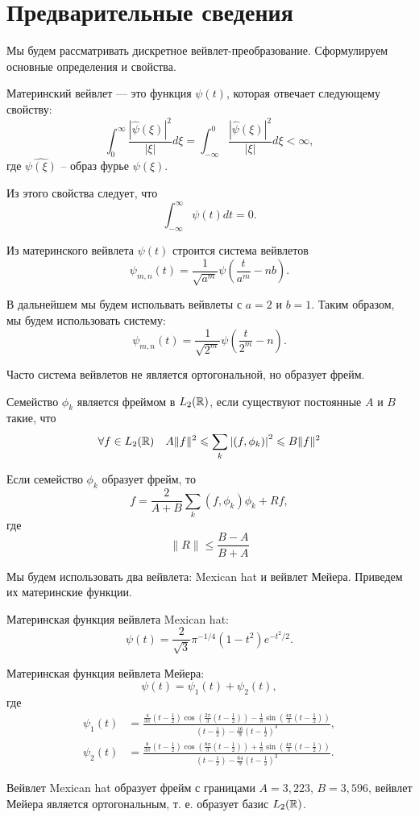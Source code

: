 \documentclass[../paper.tex]{subfiles}
\begin{document}
\section{Предварительные сведения}
Мы будем рассматривать дискретное вейвлет-преобразование. Сформулируем основные определения и свойства.
\begin{Def}
Материнский вейвлет --- это функция $\psi(t)$, которая отвечает следующему свойству:
\[
	\int_0^\infty \frac{ \left|\hat{\psi}(\xi)\right|^2 }{\left|\xi\right|} d \xi
	= \int_{-\infty}^0 \frac{ \left|\hat{\psi}(\xi)\right|^2 }{\left|\xi\right|} d \xi
	< \infty
,\] где $\hat{\psi(\xi)}$ -- образ фурье $\psi(\xi)$.
\end{Def}

Из этого свойства следует, что
\[
	\int_{-\infty}^{\infty} \psi(t) dt = 0
.\]

Из материнского вейвлета $\psi(t)$ строится система вейвлетов
\[
	\psi_{m,n}(t) = \frac{1}{\sqrt{a^m}} \psi\left(\frac{t}{a^m} - n b\right)
.\]

В дальнейшем мы будем испольвать вейвлеты с $a=2$ и $b=1$.
Таким образом, мы будем использовать систему:
\[
	\psi_{m,n}(t) = \frac{1}{\sqrt{2^m}} \psi\left(\frac{t}{2^m} - n\right)
.\]

Часто система вейвлетов не является ортогональной, но образует фрейм.
\begin{Def}
Семейство $\phi_k$ является фреймом в $L_2(\mathbb{R})$, если существуют постоянные $A$ и $B$ такие, что
\[
\forall f \in L_2(\mathbb{R}) \quad A \|f\|^2 \leqslant \sum_k \left|\left(f, \phi_k\right)\right|^2 \leqslant B \|f\|^2
\]

\begin{Lem*}
Если семейство $\phi_k$ образует фрейм, то
\[
	f = \frac{2}{A+B} \sum_k \left(f, \phi_k\right)\phi_k + Rf
,\] где \[
	\|R\| \leqslant \frac{B-A}{B+A}
\]

Мы будем использовать два вейвлета: Mexican hat и вейвлет Мейера. Приведем их материнские функции.

\begin{Def}
Материнская функция вейвлета Mexican hat:
\[
	\psi(t) = \frac{2}{\sqrt{3}} \pi^{-1/4} \left(1-t^2\right) e^{-t^2/2}
.\]
\end{Def}
\begin{Def}
Материнская функция вейвлета Мейера:
\[
	\psi(t) = \psi_1(t) + \psi_2(t)
,\] где
\begin{align*}
	\psi_1(t) &=
		\frac{
			\frac{4}{3\pi}\left(t-\frac{1}{2}\right) \cos\left(\frac{2\pi}{3}\left(t-\frac{1}{2}\right)\right) 
			- \frac{1}{\pi} \sin \left(\frac{4\pi}{3}\left(t-\frac{1}{2}\right)\right)
		}{
			\left(t-\frac{1}{2}\right) - \frac{16}{9} \left(t - \frac{1}{2}\right)^3
		}, \\
	\psi_2(t) &=
		\frac{
			\frac{8}{3\pi}\left(t-\frac{1}{2}\right) \cos\left(\frac{8\pi}{3}\left(t-\frac{1}{2}\right)\right) 
			+ \frac{1}{\pi} \sin \left(\frac{4\pi}{3}\left(t-\frac{1}{2}\right)\right)
		}{
			\left(t-\frac{1}{2}\right) - \frac{64}{9} \left(t - \frac{1}{2}\right)^3
		}.
\end{align*}
\end{Def}
\end{Lem*}
\end{Def}

Вейвлет Mexican hat образует фрейм с границами $A=3{,}223$, $B = 3{,}596$, вейвлет Мейера является ортогональным, т. е. образует базис $L_2(\mathbb{R})$.
\end{document}
